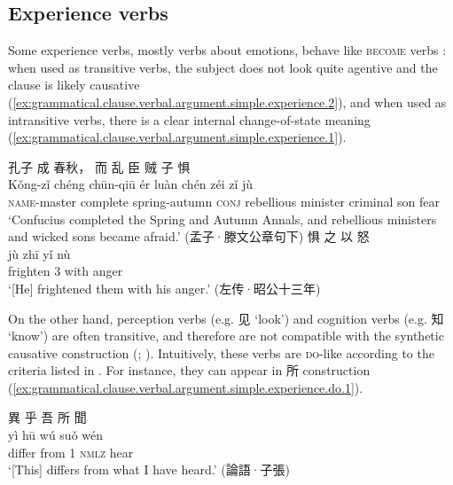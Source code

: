 \documentclass[UTF8, a4paper, oneside, scheme=plain, 12pt]{ctexrep}
\newcommand*{\citepage}[1]{p.~{#1}}
\newcommand{\translate}[1]{`#1'}
\newcommand*{\category}[1]{\textsc{#1}}
\begin{document}
\subsection{Experience verbs}
\label{sec:grammatical.clause.verbal.argument.simple.experience}
Some experience verbs, mostly verbs about emotions, behave like \category{become} verbs
\citep[\citepage{273}]{meiguang2018}:
when used as transitive verbs,
the subject does not look quite agentive and the clause is likely causative
(\ref{ex:grammatical.clause.verbal.argument.simple.experience.2}),
and when used as intransitive verbs,
there is a clear internal change-of-state meaning
(\ref{ex:grammatical.clause.verbal.argument.simple.experience.1}).

\begin{exe}
    \ex\label{ex:grammatical.clause.verbal.argument.simple.experience.1}
    \glll 孔子 成 春秋， 而 乱 臣 贼 子 惧 \\
    Kǒng-zǐ chéng chūn-qiū ér luàn chén zéi zǐ jù \\
    \category{name}-master complete spring-autumn \category{conj} rebellious minister criminal son fear \\
    \glt\translate{Confucius completed the Spring and Autumn Annals, and rebellious ministers and wicked sons became afraid.} \hfill (孟子·滕文公章句下)
    \ex\label{ex:grammatical.clause.verbal.argument.simple.experience.2}
    \glll 惧 之 以 怒 \\
    jù zhī yǐ nù \\
    frighten 3 with anger \\
    \glt\translate{[He] frightened them with his anger.} \hfill (左传·昭公十三年)
\end{exe}

On the other hand, perception verbs (e.g. 见 \translate{look}) and cognition verbs (e.g. 知 \translate{know})
are often transitive,
and therefore are not compatible with the synthetic causative construction 
(;
\citealt[\citepage{274}]{meiguang2018}).
Intuitively, these verbs are \category{do}-like according to the criteria listed in .
For instance, they can appear in 所 construction
(\ref{ex:grammatical.clause.verbal.argument.simple.experience.do.1}).

\begin{exe}
    \ex\label{ex:grammatical.clause.verbal.argument.simple.experience.do.1}
    \glll 異 乎 吾 所 聞 \\
    yì hū wú suǒ wén \\
    differ from 1 \category{nmlz} hear \\
    \glt\translate{[This] differs from what I have heard.} \hfill (論語·子張)
\end{exe}
\end{document}

